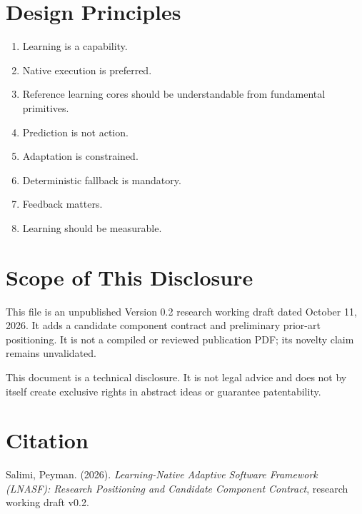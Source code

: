 \documentclass[11pt,a4paper]{article}
\begin{document}
\section{Design Principles}
\begin{enumerate}
\item Learning is a capability.
\item Native execution is preferred.
\item Reference learning cores should be understandable from fundamental primitives.
\item Prediction is not action.
\item Adaptation is constrained.
\item Deterministic fallback is mandatory.
\item Feedback matters.
\item Learning should be measurable.
\end{enumerate}

\section{Scope of This Disclosure}
This file is an unpublished Version 0.2 research working draft dated October 11, 2026. It adds a candidate component contract and preliminary prior-art positioning. It is not a compiled or reviewed publication PDF; its novelty claim remains unvalidated.

This document is a technical disclosure. It is not legal advice and does not by itself create exclusive rights in abstract ideas or guarantee patentability.

\section{Citation}
Salimi, Peyman. (2026). \textit{Learning-Native Adaptive Software Framework (LNASF): Research Positioning and Candidate Component Contract}, research working draft v0.2.
\end{document}
